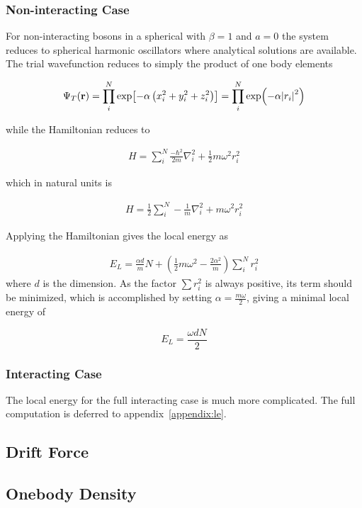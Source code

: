 \subsubsection{Non-interacting Case}
For non-interacting bosons in a spherical with \(\beta = 1\) and \(a = 0\) the
system reduces to spherical harmonic oscillators where analytical solutions are
available. The trial wavefunction reduces to simply the product of one body
elements

\newcommand{\psit}{\Psi_T(\vb{r})}
\newcommand{\onebody}{\prod_{i}^{N}\exp{-\alpha\left[\left( x_i^2 + y_i^2 + \beta
      z_i^2\right)\right]}}
\begin{align*}
  \psit = \prod_{i}^{N}\exp[-\alpha\left( x_{i}^{2}+y_{i}^{2}+z_{i}^{2} \right)] = \prod_{i}^{N}\exp(-\alpha \abs{r_{i}}^{2})
\end{align*}

while the Hamiltonian reduces to

\begin{align*}
  H = \sum_{i}^{N} \frac{-\hbar^{2}}{2m}\nabla_{i}^{2} + \frac{1}{2}m\omega^{2}r_{i}^{2}
\end{align*}

which in natural units is

\newcommand{\lapl}[1]{\nabla_{#1}^2}
\begin{align*}
  H = \frac{1}{2}\sum_{i}^{N} -\frac{1}{m}\lapl{i} + m\omega^{2}r_{i}^{2}
\end{align*}

Applying the Hamiltonian gives the local energy as

\begin{align*}
  E_{L} = \frac{\alpha d}{m} N + \left( \frac{1}{2}m\omega^{2} - \frac{2\alpha^{2}}{m} \right)\sum_{i}^{N}r_{i}^{2}
\end{align*}
 where \(d\) is the dimension. As the factor \(\sum r_{i}^{2}\) is always
 positive, its term should be minimized, which is accomplished by setting
 \(\alpha = \frac{m\omega}{2}\), giving a minimal local energy of

 \begin{equation}
   E_{L} = \frac{\omega d N}{2}
   \label{eq:noninteracting}
 \end{equation}

\subsubsection{Interacting Case}
The local energy for the full interacting case is much more complicated. The
full computation is deferred to appendix~\ref{appendix:le}.





\subsection{Drift Force}
\subsection{Onebody Density}
